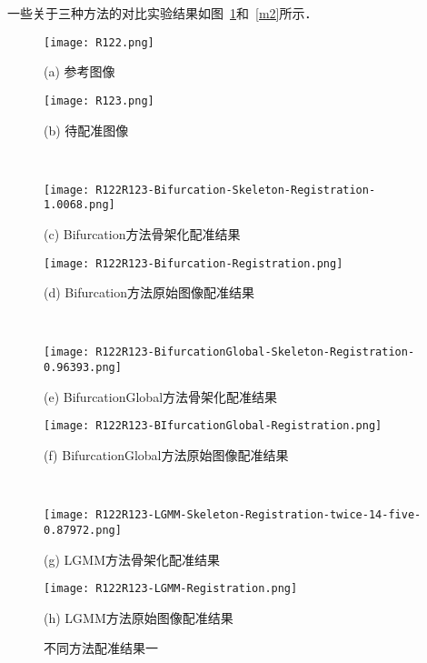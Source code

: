 一些关于三种方法的对比实验结果如图~\ref{m1}和~\ref{m2}所示．
\begin{figure}
\centering
\begin{minipage}[b]{0.42\linewidth} 
      \centering 
      \texttt{[image: R122.png]}
        \centerline{\footnotesize{(a) 参考图像}}\medskip
\end{minipage}
  \begin{minipage}[b]{0.42\linewidth}
    \centering
    \texttt{[image: R123.png]}
      \centerline{\footnotesize{(b) 待配准图像}}\medskip
  \end{minipage}
  \\
    \begin{minipage}[b]{0.42\linewidth}
    \centering
    \texttt{[image: R122R123-Bifurcation-Skeleton-Registration-1.0068.png]}
      \centerline{\footnotesize{(c) Bifurcation方法骨架化配准结果}}\medskip
  \end{minipage}
      \begin{minipage}[b]{0.42\linewidth}
    \centering
    \texttt{[image: R122R123-Bifurcation-Registration.png]}
      \centerline{\footnotesize{(d) Bifurcation方法原始图像配准结果}}\medskip
  \end{minipage}
    \\
  \begin{minipage}[b]{0.42\linewidth}
    \centering
    \texttt{[image: R122R123-BifurcationGlobal-Skeleton-Registration-0.96393.png]}
      \centerline{\footnotesize{(e) BifurcationGlobal方法骨架化配准结果}}\medskip
  \end{minipage}
  \begin{minipage}[b]{0.42\linewidth}
    \centering
    \texttt{[image: R122R123-BIfurcationGlobal-Registration.png]}
      \centerline{\footnotesize{(f) BifurcationGlobal方法原始图像配准结果}}\medskip
  \end{minipage}
  \\
     \begin{minipage}[b]{0.42\linewidth}
    \centering
    \texttt{[image: R122R123-LGMM-Skeleton-Registration-twice-14-five-0.87972.png]}
      \centerline{\footnotesize{(g) LGMM方法骨架化配准结果}}\medskip
  \end{minipage}
   \begin{minipage}[b]{0.42\linewidth}
    \centering
    \texttt{[image: R122R123-LGMM-Registration.png]}
      \centerline{\footnotesize{(h) LGMM方法原始图像配准结果}}\medskip
  \end{minipage}
 \caption{不同方法配准结果一}
\label{m1}
\end{figure}

